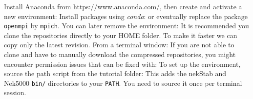 {}
\markdownRendererSectionEnd \markdownRendererSectionBegin
{}\markdownRendererInterblockSeparator
{}Install Anaconda from \url{https://www.anaconda.com/}, then create and activate a new environment:\markdownRendererInterblockSeparator
{}\markdownRendererInterblockSeparator
{}Install packages using \textit{conda}:\markdownRendererInterblockSeparator
{}\markdownRendererInterblockSeparator
{}or eventually replace the package \texttt{openmpi} by \texttt{mpich}.\markdownRendererInterblockSeparator
{}\markdownRendererInterblockSeparator
{}You can later remove the environment:\markdownRendererInterblockSeparator
{}\markdownRendererInterblockSeparator
{}\newpage\markdownRendererInterblockSeparator
{}
\markdownRendererSectionEnd 
\markdownRendererSectionEnd \markdownRendererSectionBegin
{}\markdownRendererInterblockSeparator
{}It is recommended you clone the repositories directly to your HOME folder. To make it faster we can copy only the latest revision. From a terminal window:\markdownRendererInterblockSeparator
{}\markdownRendererInterblockSeparator
{}\markdownRendererInterblockSeparator
{}If you are not able to clone and have to manually download the compressed repositories, you might encounter permission issues that can be fixed with:\markdownRendererInterblockSeparator
{}\markdownRendererInterblockSeparator
{}\markdownRendererSectionBegin
{}\markdownRendererInterblockSeparator
{}To set up the environment, source the path script from the tutorial folder:\markdownRendererInterblockSeparator
{}\markdownRendererInterblockSeparator
{}This adds the nekStab and Nek5000 \texttt{bin/} directories to your \texttt{PATH}. You need to source it once per terminal session. \newpage\markdownRendererInterblockSeparator
